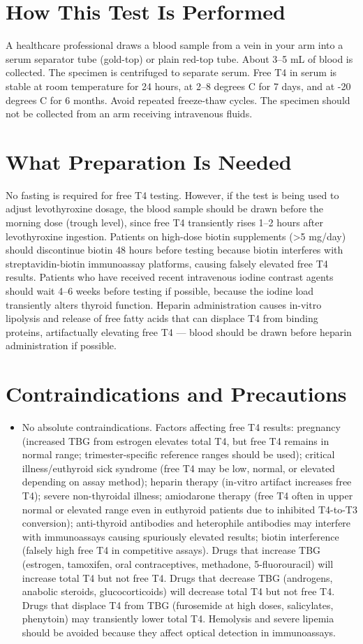 \section*{How This Test Is Performed}
A healthcare professional draws a blood sample from a vein in your arm into a serum separator tube (gold-top) or plain red-top tube. About 3--5 mL of blood is collected. The specimen is centrifuged to separate serum. Free T4 in serum is stable at room temperature for 24 hours, at 2--8 degrees C for 7 days, and at -20 degrees C for 6 months. Avoid repeated freeze-thaw cycles. The specimen should not be collected from an arm receiving intravenous fluids.

\section*{What Preparation Is Needed}
No fasting is required for free T4 testing. However, if the test is being used to adjust levothyroxine dosage, the blood sample should be drawn before the morning dose (trough level), since free T4 transiently rises 1--2 hours after levothyroxine ingestion. Patients on high-dose biotin supplements (>5 mg/day) should discontinue biotin 48 hours before testing because biotin interferes with streptavidin-biotin immunoassay platforms, causing falsely elevated free T4 results. Patients who have received recent intravenous iodine contrast agents should wait 4--6 weeks before testing if possible, because the iodine load transiently alters thyroid function. Heparin administration causes in-vitro lipolysis and release of free fatty acids that can displace T4 from binding proteins, artifactually elevating free T4 --- blood should be drawn before heparin administration if possible.

\section*{Contraindications and Precautions}
\begin{itemize}
  \item No absolute contraindications. Factors affecting free T4 results: pregnancy (increased TBG from estrogen elevates total T4, but free T4 remains in normal range; trimester-specific reference ranges should be used); critical illness/euthyroid sick syndrome (free T4 may be low, normal, or elevated depending on assay method); heparin therapy (in-vitro artifact increases free T4); severe non-thyroidal illness; amiodarone therapy (free T4 often in upper normal or elevated range even in euthyroid patients due to inhibited T4-to-T3 conversion); anti-thyroid antibodies and heterophile antibodies may interfere with immunoassays causing spuriously elevated results; biotin interference (falsely high free T4 in competitive assays). Drugs that increase TBG (estrogen, tamoxifen, oral contraceptives, methadone, 5-fluorouracil) will increase total T4 but not free T4. Drugs that decrease TBG (androgens, anabolic steroids, glucocorticoids) will decrease total T4 but not free T4. Drugs that displace T4 from TBG (furosemide at high doses, salicylates, phenytoin) may transiently lower total T4. Hemolysis and severe lipemia should be avoided because they affect optical detection in immunoassays.
\end{itemize}
